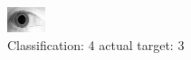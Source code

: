 \begin{figure}[h!]
\begin{center}
\includegraphics[width=0.60\columnwidth]{figures/ID1863_class_4_target_3.png}
\end{center}
\caption{ Classification: 4 actual target: 3}
\label{fig:ID1863_class_4_target_3}
\end{figure}

